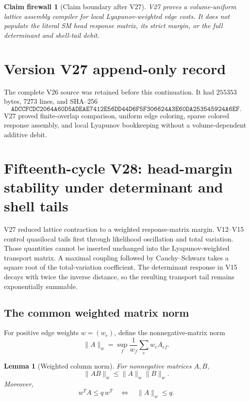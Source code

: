 \documentclass[11pt]{article}
\newtheorem{lemma}[theorem]{Lemma}
\newtheorem{firewall}[theorem]{Claim firewall}
\theoremstyle{remark}
\begin{document}
\begin{firewall}[Claim boundary after V27]
\label{fire:v15v27}
V27 proves a volume-uniform lattice assembly compiler for local
Lyapunov-weighted edge costs.  It does not populate the literal SM
head response matrix, its strict margin, or the full determinant and
shell-tail debit.
\end{firewall}

\section*{Version V27 append-only record}
The complete V26 source was retained before this continuation.  It
had \(255353\) bytes, \(7273\) lines, and SHA--256
\[
 \texttt{ADCCFCDC2064A60D5ADEAE7412E56DD44D6F5F306624A3E60DA253545924A6EF}.
\]
V27 proved finite-overlap comparison, uniform edge coloring, sparse
colored response assembly, and local Lyapunov bookkeeping without a
volume-dependent additive debit.
\section{Fifteenth-cycle V28: head-margin stability under determinant and shell tails}
\label{sec:v15v28}

V27 reduced lattice contraction to a weighted response-matrix
margin.  V12--V15 control quasilocal tails first through likelihood
oscillation and total variation.  Those quantities cannot be
inserted unchanged into the Lyapunov-weighted transport matrix.
A maximal coupling followed by Cauchy--Schwarz takes a square root
of the total-variation coefficient.  The determinant response in
V15 decays with twice the inverse distance, so the resulting
transport tail remains exponentially summable.

\subsection{The common weighted matrix norm}

For positive edge weights \(w=(w_e)\), define the nonnegative-matrix
norm
\[
 \|A\|_w
 =
 \sup_f\frac1{w_f}\sum_e w_eA_{ef}.                         \tag{28.1}
\]

\begin{lemma}[Weighted column norm]
\label{lem:v15v28-norm}
For nonnegative matrices \(A,B\),
\[
 \|AB\|_w\le\|A\|_w\|B\|_w.                                \tag{28.2}
\]
Moreover,
\[
 w^TA\le q\,w^T
 \quad\Longleftrightarrow\quad
 \|A\|_w\le q.                                              \tag{28.3}
\]
\end{lemma}
\end{document}
